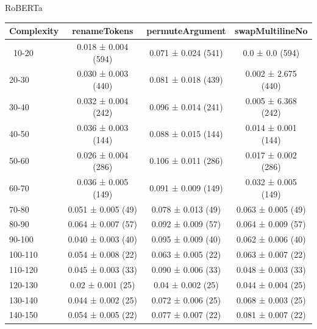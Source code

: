 \documentclass[sigconf,review,anonymous]{acmart}
\begin{document}
{  RoBERTa
    \begin{table}[H]
      \tiny
      \begin{tabular}{l|ccc}
        Complexity          & renameTokens        & permuteArgument     & swapMultilineNo     \\\hline\
        10-20               & 0.018 ± 0.004 (594) & 0.071 ± 0.024 (541) & 0.0 ± 0.0 (594)     \\
        20-30               & 0.030 ± 0.003 (440) & 0.081 ± 0.018 (439) & 0.002 ± 2.675 (440) \\
        30-40               & 0.032 ± 0.004 (242) & 0.096 ± 0.014 (241) & 0.005 ± 6.368 (242) \\
        40-50               & 0.036 ± 0.003 (144) & 0.088 ± 0.015 (144) & 0.014 ± 0.001 (144) \\
        50-60               & 0.026 ± 0.004 (286) & 0.106 ± 0.011 (286) & 0.017 ± 0.002 (286) \\
        60-70               & 0.036 ± 0.005 (149) & 0.091 ± 0.009 (149) & 0.032 ± 0.005 (149) \\
        70-80               & 0.051 ± 0.005 (49)  & 0.078 ± 0.013 (49)  & 0.063 ± 0.005 (49)  \\
        80-90               & 0.064 ± 0.007 (57)  & 0.092 ± 0.009 (57)  & 0.064 ± 0.009 (57)  \\
        90-100              & 0.040 ± 0.003 (40)  & 0.095 ± 0.009 (40)  & 0.062 ± 0.006 (40)  \\
        100-110             & 0.054 ± 0.008 (22)  & 0.063 ± 0.005 (22)  & 0.063 ± 0.007 (22)  \\
        110-120             & 0.045 ± 0.003 (33)  & 0.090 ± 0.006 (33)  & 0.048 ± 0.003 (33)  \\
        120-130             & 0.02 ± 0.001 (25)   & 0.04 ± 0.002 (25)   & 0.044 ± 0.004 (25)  \\
        130-140             & 0.044 ± 0.002 (25)  & 0.072 ± 0.006 (25)  & 0.068 ± 0.003 (25)  \\
        140-150             & 0.054 ± 0.005 (22)  & 0.077 ± 0.007 (22)  & 0.081 ± 0.007 (22)
      \end{tabular}
    \end{table}
  }

\end{document}
